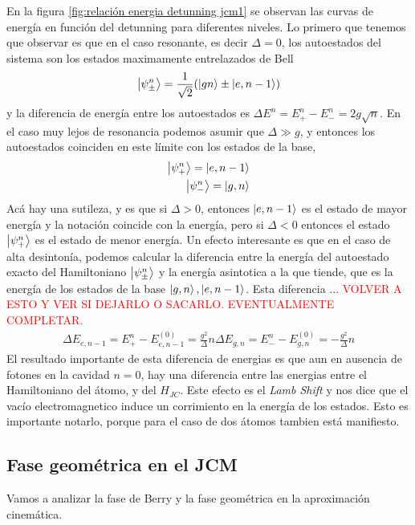 En la figura \ref{fig:relación energia detunning jcm1} se observan las curvas de energ\'ia en funci\'on del detunning para diferentes niveles. Lo primero que tenemos que observar es que en el caso resonante, es decir $\Delta=0$, los autoestados del sistema son los estados maximamente entrelazados de Bell
\begin{equation}
    \ket{\psi_\pm^n}=\frac{1}{\sqrt{2}}(\ket{gn}\pm\ket{e,n-1})
\end{equation} 
y la diferencia de energ\'ia entre los autoestados es $\Delta E^n =E^n_+-E^n_-=2g\sqrt{n}$. En el caso muy lejos de resonancia podemos asumir que $\Delta \gg g $, y entonces los autoestados coinciden en este l\'imite con los estados de la base, 
\begin{equation}
    \begin{aligned}
        \ket{\psi^n_+}=\ket{e,n-1} \\
        \ket{\psi^n_-}=\ket{g,n}
    \end{aligned}
\end{equation}
Ac\'a hay una sutileza, y es que si $\Delta>0$, entonces $\ket{e,n-1}$ es el estado de mayor energ\'ia y la notaci\'on coincide con la energ\'ia, pero si $\Delta<0$ entonces el estado $\ket{\psi^n_+}$ es el estado de menor energ\'ia. 
Un efecto interesante es que en el caso de alta desinton\'ia, podemos calcular la diferencia entre la energía del autoestado exacto del Hamiltoniano $\ket{\psi_\pm^n}$ y la energía asintotica a la que tiende, que es la energía de los estados de la base $\ket{g,n},\ket{e,n-1}$. Esta diferencia ... \textcolor{red}{VOLVER A ESTO Y VER SI DEJARLO O SACARLO. EVENTUALMENTE COMPLETAR.}
\begin{equation}
    \begin{aligned}
        \Delta E_{e,n-1}=E_+^n-E^{(0)}_{e,n-1}=\frac{g^2}{\Delta}n
        \Delta E_{g,n}=E_-^n-E^{(0)}_{g,n}=-\frac{g^2}{\Delta}n
    \end{aligned}
\end{equation}
El resultado importante de esta diferencia de energias es que aun en ausencia de fotones en la cavidad $n=0$, hay una diferencia entre las energias entre el Hamiltoniano del átomo, y del $H_{JC}$. Este efecto es el \textit{Lamb Shift} y nos dice que el vac\'io electromagnetico induce un corrimiento en la energ\'ia de los estados. Esto es importante notarlo, porque para el caso de dos átomos tambien est\'a manifiesto.

\subsection{Fase geométrica en el JCM}
Vamos a analizar la fase de Berry y la fase geométrica en la aproximación cinemática.
